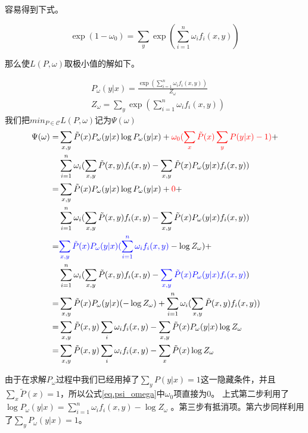 \documentclass{article}
\begin{document}
        容易得到下式。
        
	\begin{equation}
		\exp{(1-\omega_{0})} = \sum_{y}\exp{(\sum_{i=1}^{n}\omega_{i}f_{i}(x,y))} 
	\end{equation}
	   
	   那么使$L(P, \omega)$取极小值的解如下。
	   
	\begin{equation}
		\begin{aligned}
			&P_{\omega}(y|x) = \frac{\exp{(\sum_{i=1}^{n}\omega_{i}f_{i}(x,y))}}{Z_{\omega}} \\
			&Z_{\omega} = \sum_{y}\exp{(\sum_{i=1}^{n}\omega_{i}f_{i}(x,y))} 
		\end{aligned}
	\end{equation}        		
	  我们把$min_{P\in\mathcal{C}}L(P, \omega)$记为$\Psi(\omega)$
	\begin{equation}
		\begin{aligned}
			\Psi(\omega) =&\sum_{x,y}\tilde{P}(x)P_{\omega}(y|x)\log{P_{\omega}(y|x)}+\textcolor{red}{\omega_{0}(\sum_{x}\tilde{P}(x)\sum_{y}P(y|x)-1)}+\\
			&\sum_{i=1}^{n}\omega_{i}(\sum_{x,y}\tilde{P}(x,y)f_{i}(x,y)-\sum_{x,y}\tilde{P}(x)P_{\omega}(y|x)f_{i}(x,y))\\
			=&\sum_{x,y}\tilde{P}(x)P_{\omega}(y|x)\log{P_{\omega}(y|x)}+\textcolor{red}{0}+\\ &\sum_{i=1}^{n}\omega_{i}(\sum_{x,y}\tilde{P}(x,y)f_{i}(x,y)-\sum_{x,y}\tilde{P}(x)P_{\omega}(y|x)f_{i}(x,y))\\
			=&\textcolor{blue}{\sum_{x,y}\tilde{P}(x)P_{\omega}(y|x)(\sum_{i=1}^{n}\omega_{i}f_{i}(x,y)}-\log{Z_{\omega}})+\\
			&\sum_{i=1}^{n}\omega_{i}(\sum_{x,y}\tilde{P}(x,y)f_{i}(x,y)-\textcolor{blue}{\sum_{x,y}\tilde{P}(x)P_{\omega}(y|x)f_{i}(x,y)})\\
			=&\sum_{x,y}\tilde{P}(x)P_{\omega}(y|x)(-\log{Z_{\omega}})+\sum_{i=1}^{n}\omega_{i}(\sum_{x,y}\tilde{P}(x,y)f_{i}(x,y))\\	=&\sum_{x,y}\tilde{P}(x,y)\sum_{i}\omega_{i}f_{i}(x,y)-\sum_{x,y}\tilde{P}(x)P_{\omega}(y|x)\log{Z_{\omega}}	\\
			=&\sum_{x,y}\tilde{P}(x,y)\sum_{i}\omega_{i}f_{i}(x,y)-\sum_{x}\tilde{P}(x)\log{Z_{\omega}}	\label{eq.psi_omega}
		\end{aligned}
	\end{equation}

   由于在求解$P_{\omega}$过程中我们已经用掉了$\sum_{y}P(y|x)=1$这一隐藏条件，并且$\sum_{x}\tilde{P}(x)=1$，所以公式\ref{eq.psi_omega}中$\omega_{0}$项直接为0。
   上式第二步利用了$\log{P_{\omega}(y|x)}=\sum_{i=1}^{n}\omega_{i}f_{i}(x,y)-\log{Z_{\omega}}$ 。第三步有抵消项。第六步同样利用了$\sum_{y}P_{\omega}(y|x)=1$。
   
\end{document}
